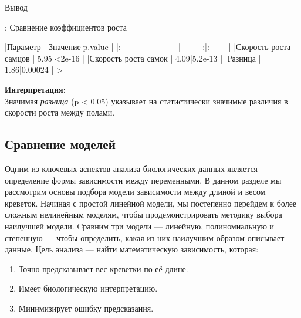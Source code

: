 \documentclass[
  letterpaper,
  DIV=11,
  numbers=noendperiod]{scrreprt}
\newenvironment{Shaded}{\begin{snugshade}}{\end{snugshade}}
\newcommand{\ErrorTok}[1]{\textcolor[rgb]{0.68,0.00,0.00}{#1}}
\newcommand{\FloatTok}[1]{\textcolor[rgb]{0.68,0.00,0.00}{#1}}
\newcommand{\NormalTok}[1]{\textcolor[rgb]{0.00,0.23,0.31}{#1}}
\newcommand{\SpecialCharTok}[1]{\textcolor[rgb]{0.37,0.37,0.37}{#1}}
\begin{document}
Вывод

\begin{Shaded}
\begin{Highlighting}[]
\SpecialCharTok{:}\NormalTok{ Сравнение коэффициентов роста}

\SpecialCharTok{|}\NormalTok{Параметр              }\SpecialCharTok{|}\NormalTok{ Значение}\SpecialCharTok{|}\NormalTok{p.value }\SpecialCharTok{|}
\ErrorTok{|:}\SpecialCharTok{{-}{-}{-}{-}{-}{-}{-}{-}{-}{-}{-}{-}{-}{-}{-}{-}{-}{-}{-}{-}{-}}\ErrorTok{|}\SpecialCharTok{{-}{-}{-}{-}{-}{-}{-}{-}}\ErrorTok{:|:}\SpecialCharTok{{-}{-}{-}{-}{-}{-}{-}}\ErrorTok{|}
\ErrorTok{|}\NormalTok{Скорость роста самцов }\SpecialCharTok{|}     \FloatTok{5.95}\SpecialCharTok{|}\ErrorTok{\textless{}}\FloatTok{2e{-}16}  \SpecialCharTok{|}
\ErrorTok{|}\NormalTok{Скорость роста самок  }\SpecialCharTok{|}     \FloatTok{4.09}\SpecialCharTok{|}\FloatTok{5.2e{-}13} \SpecialCharTok{|}
\ErrorTok{|}\NormalTok{Разница               }\SpecialCharTok{|}     \FloatTok{1.86}\SpecialCharTok{|}\FloatTok{0.00024} \SpecialCharTok{|}
\ErrorTok{\textgreater{}} 
\end{Highlighting}
\end{Shaded}

\textbf{Интерпретация:}\\
Значимая \emph{разница} (p \textless{} 0.05) указывает на статистически
значимые различия в скорости роста между полами.

\subsection{Сравнение
моделей}\label{ux441ux440ux430ux432ux43dux435ux43dux438ux435-ux43cux43eux434ux435ux43bux435ux439}

Одним из ключевых аспектов анализа биологических данных является
определение формы зависимости между переменными. В данном разделе мы
рассмотрим основы подбора модели зависимости между длиной и весом
креветок. Начиная с простой линейной модели, мы постепенно перейдем к
более сложным нелинейным моделям, чтобы продемонстрировать методику
выбора наилучшей модели. Cравним три модели --- линейную, полиномиальную
и степенную --- чтобы определить, какая из них наилучшим образом
описывает данные. Цель анализа --- найти математическую зависимость,
которая:

\begin{enumerate}
\def\labelenumi{\arabic{enumi}.}
\item
  Точно предсказывает вес креветки по её длине.
\item
  Имеет биологическую интерпретацию.
\item
  Минимизирует ошибку предсказания.
\end{enumerate}
\end{document}
